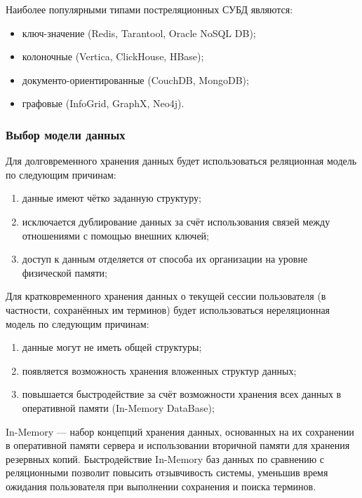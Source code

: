 \begin{enumerate}[label*=\arabic*.]
	Наиболее популярными типами постреляционных СУБД являются:
	
	\begin{itemize}[label*=---]
		\item ключ-значение (Redis, Tarantool, Oracle NoSQL DB);
		\item колоночные (Vertica, ClickHouse, HBase);
		\item документо-ориентированные (CouchDB, MongoDB);
		\item графовые (InfoGrid, GraphX, Neo4j).
	
	\end{itemize}
	
\end{enumerate}



\subsubsection{Выбор модели данных}

Для долговременного хранения данных будет использоваться реляционная модель по следующим причинам:

\begin{enumerate}[label*=\arabic*)]
	\item данные имеют чётко заданную структуру;
	\item исключается дублирование данных за счёт использования связей между отношениями с помощью внешних ключей;
	\item доступ к данным отделяется от способа их организации на уровне физической памяти;
	
\end{enumerate}

Для кратковременного хранения данных о текущей сессии пользователя (в частности, сохранённых им терминов) будет использоваться нереляционная модель по следующим причинам:

\begin{enumerate}[label*=\arabic*)]
	\item данные могут не иметь общей структуры;
	\item появляется возможность хранения вложенных структур данных;
	\item повышается быстродействие за счёт возможности хранения всех данных в оперативной памяти (In-Memory DataBase);
	
\end{enumerate}

In-Memory --- набор концепций хранения данных, основанных на их сохранении в оперативной памяти сервера и использовании вторичной памяти для хранения резервных копий. Быстродействие In-Memory баз данных по сравнению с реляционными позволит повысить отзывчивость системы, уменьшив время ожидания пользователя при выполнении сохранения и поиска терминов.



